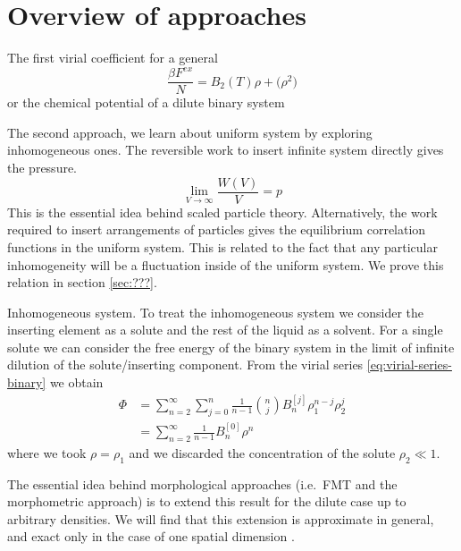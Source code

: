 \documentclass[11pt]{report}
\begin{document}
\section{Overview of approaches}

The first virial coefficient for a general
\begin{equation}
  \frac{\beta F^{ex}}{N} =
  B_2(T) \rho + \mathcal(\rho^2)
\end{equation}
or the chemical potential of a dilute binary system

The second approach, we learn about uniform system by exploring inhomogeneous ones.
The reversible work to insert infinite system directly gives the pressure.
\begin{equation}
  \lim_{V \to \infty} \frac{W(V)}{V} = p
\end{equation}
This is the essential idea behind scaled particle theory.
Alternatively, the work required to insert arrangements of particles gives the equilibrium correlation functions in the uniform system.
This is related to the fact that any particular inhomogeneity will be a fluctuation inside of the uniform system.
We prove this relation in section \ref{sec:???}.

Inhomogeneous system.
To treat the inhomogeneous system we consider the inserting element as a solute and the rest of the liquid as a solvent.
For a single solute we can consider the free energy of the binary system in the limit of infinite dilution of the solute/inserting component.
From the virial series \eqref{eq:virial-series-binary} we obtain
\begin{equation}
  \begin{aligned}
    \Phi &=
    \sum_{n=2}^\infty \sum_{j=0}^{n}
    \frac{1}{n-1} {n \choose j} B_n^{[j]} \rho_1^{n-j} \rho_2^j \\
    &=
    \sum_{n=2}^\infty
    \frac{1}{n-1} B_n^{[0]} \rho^n
  \end{aligned}
\end{equation}
where we took $\rho = \rho_1$ and we discarded the concentration of the solute $\rho_2 \ll 1$.

The essential idea behind morphological approaches (i.e.\ FMT and the morphometric approach) is to extend this result for the dilute case up to arbitrary densities.
We will find that this extension is approximate in general, and exact only in the case of one spatial dimension%
.
\end{document}
